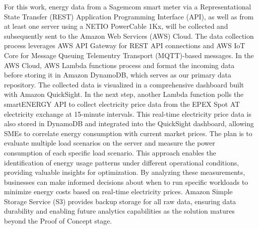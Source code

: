 For this work, energy data from a Sagemcom smart meter via a Representational State Transfer (REST) Application Programming Interface (API),
as well as from at least one server using a NETIO PowerCable 1Kx, will be collected and subsequently sent to the Amazon Web Services (AWS) Cloud.
The data collection process leverages AWS API Gateway for REST API connections and AWS IoT Core for Message Queuing Telementry Transport (MQTT)-based messages.
In the AWS Cloud, AWS Lambda functions process and format the incoming data before storing it in Amazon DynamoDB, which serves as our primary data repository. 
The collected data is visualized in a comprehensive dashboard built with Amazon QuickSight. In the next step, 
another Lambda function polls the smartENERGY API to collect electricity price data from the EPEX Spot AT electricity exchange at 15-minute intervals. 
This real-time electricity price data is also stored in DynamoDB and integrated into the QuickSight dashboard, allowing SMEs to correlate energy consumption with current market prices. 
The plan is to evaluate multiple load scenarios on the server and measure the power consumption of each specific load scenario.
This approach enables the identification of energy usage patterns under different operational conditions, providing valuable insights for optimization.
By analyzing these measurements, businesses can make informed decisions about when to run specific workloads to minimize energy costs based on real-time electricity prices.
Amazon Simple Storage Service (S3) provides backup storage for all raw data,
ensuring data durability and enabling future analytics capabilities as the solution matures beyond the Proof of Concept stage.